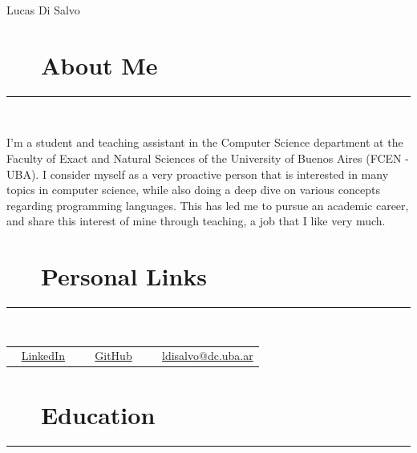 \documentclass{article}
\begin{document}
\pagestyle{empty}

\par{\centering
		{\huge Lucas Di Salvo}
	\bigskip\par}

\section*{\faUser ~~ About Me}
\hrule

\
\newline
\

I'm a student and teaching assistant in the Computer Science department at the Faculty of Exact and Natural Sciences of the University of Buenos Aires (FCEN - UBA). I consider myself as a very proactive person that is interested in many topics in computer science, while also doing a deep dive on various concepts regarding programming languages. This has led me to pursue an academic career, and share this interest of mine through teaching, a job that I like very much.

\section*{\faAt ~~ Personal Links}
\hrule

\
\newline
\

\begin{tabular}{l | l | l}
      \faLinkedin ~ \href{https://www.linkedin.com/in/lucas-di-salvo-6578b915a}{LinkedIn} \
     & \faGithub ~ \href{https://github.com/lucasDS-0}{GitHub}  \
     & \faEnvelope ~ \href{mailto:ldisalvo@dc.uba.ar}{ldisalvo@dc.uba.ar}
\end{tabular}

\section*{\faBook ~~ Education}
\hrule

\
\newline
\
\end{document}
